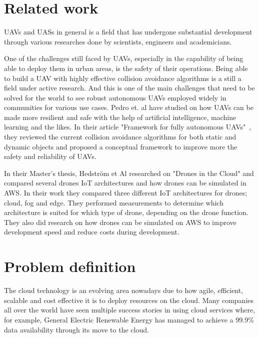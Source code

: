 
\section{Related work}
\label{sec:related-work}

UAVs and UASs in general is a field that has undergone substantial development through various researches done by scientists, engineers and academicians.

One of the challenges still faced by UAVs, especially in the capability of being able to deploy them in urban areas, is the safety of their operations. Being able to build a UAV with highly effective collision avoidance algorithms is a still a field under active research. And this is one of the main challenges that need to be solved for the world to see robust autonomous UAVs employed widely in communities for various use cases. Pedro et. al have studied on how UAVs can be made more resilient and safe with the help of artificial intelligence, machine learning and the likes. In their article "Framework for fully autonomous UAVs"~\cite{Pedro2020}, they reviewed the current collision avoidance algorithms for both static and dynamic objects and proposed a conceptual framework to improve more the safety and reliability of UAVs.

In their Master's thesis, Hedström et Al researched on "Drones in the Cloud" and compared several drones IoT architectures and how drones can be simulated in AWS\cite{mscdronesinthecloud}. In their work they compared three different IoT architectures for drones; cloud, fog and edge. They performed measurements to determine which architecture is suited for which type of drone, depending on the drone function. They also did research on how drones can be simulated on AWS to improve development speed and reduce costs during development.




\section{Problem definition}
\label{sec:problem-definition}
The cloud technology is an evolving area nowadays due to how agile, efficient, scalable and cost effective it is to deploy resources on the cloud. Many companies all over the world have seen multiple success stories in using cloud services where, for example, General Electric Renewable Energy has managed to achieve a 99.9\% data availability through its move to the cloud\cite{awsgerenewableenergy}.

